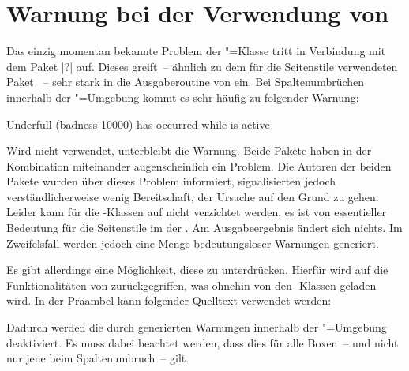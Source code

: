 \section{Warnung bei der Verwendung von }
%
%
Das einzig momentan bekannte Problem der \TUDScript"=Klasse tritt in Verbindung 
mit dem Paket |?| auf. Dieses greift~-- ähnlich zu dem für 
die Seitenstile verwendeten Paket ~-- sehr stark in 
die Ausgaberoutine von  ein. Bei Spaltenumbrüchen innerhalb der 
"=Umgebung kommt es sehr häufig zu folgender Warnung:
%
\begin{quoting}
\begin{Code}
Underfull \hbox (badness 10000) has occurred while \output is active
\end{Code}
\end{quoting}
%
Wird  nicht verwendet, unterbleibt die Warnung. Beide 
Pakete haben in der Kombination miteinander augenscheinlich ein Problem. Die 
Autoren der beiden Pakete wurden über dieses Problem informiert, signalisierten 
jedoch verständlicherweise wenig Bereitschaft, der Ursache auf den Grund zu 
gehen. Leider kann für die \TUDScript-Klassen auf  
nicht verzichtet werden, es ist von essentieller Bedeutung für die Seitenstile 
im \CD der \TnUD. Am Ausgabeergebnis ändert sich nichts. Im Zweifelsfall werden 
jedoch eine Menge bedeutungsloser Warnungen generiert. 

Es gibt allerdings eine Möglichkeit, diese zu unterdrücken. Hierfür wird auf 
die Funktionalitäten von  zurückgegriffen, was ohnehin von 
den \TUDScript-Klassen geladen wird. In der Präambel kann folgender Quelltext 
verwendet werden:
%
\begin{quoting}
\begin{Code}
\makeatletter
{}
\makeatother
\end{Code}
\end{quoting}
%
Dadurch werden die durch  generierten Warnungen innerhalb der 
"=Umgebung deaktiviert. Es muss dabei beachtet werden, 
dass dies für alle Boxen~-- und nicht nur jene beim Spaltenumbruch~-- gilt.




